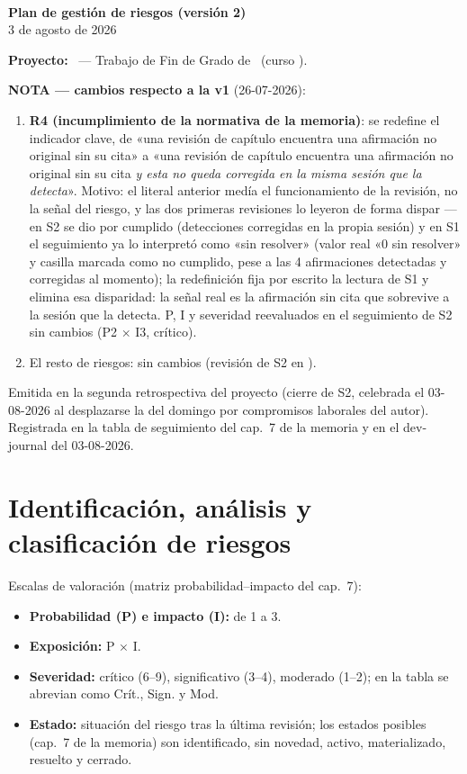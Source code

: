 \documentclass[11pt,a4paper]{article}
\begin{document}
\begin{center}
  {\Huge\bfseries\bukit}\\[0.5cm]
  {\Large\bfseries Plan de gestión de riesgos (versión 2)}\\[0.4cm]
  {\large 3 de agosto de 2026}
\end{center}
\vspace{0.6cm}

\textbf{Proyecto:} \thesisTitle\ — Trabajo de Fin de Grado de \thesisAuthor\ (curso \thesisCourse).

\textbf{NOTA — cambios respecto a la v1} (26-07-2026):
\begin{enumerate}
  \item \textbf{R4 (incumplimiento de la normativa de la memoria)}: se redefine el indicador clave, de «una revisión de capítulo encuentra una afirmación no original sin su cita» a «una revisión de capítulo encuentra una afirmación no original sin su cita \emph{y esta no queda corregida en la misma sesión que la detecta}».
  Motivo: el literal anterior medía el funcionamiento de la revisión, no la señal del riesgo, y las dos primeras revisiones lo leyeron de forma dispar — en S2 se dio por cumplido (detecciones corregidas en la propia sesión) y en S1 el seguimiento ya lo interpretó como «sin resolver» (valor real «0 sin resolver» y casilla marcada como no cumplido, pese a las 4 afirmaciones detectadas y corregidas al momento); la redefinición fija por escrito la lectura de S1 y elimina esa disparidad: la señal real es la afirmación sin cita que sobrevive a la sesión que la detecta.
  P, I y severidad reevaluados en el seguimiento de S2 sin cambios (P2 \(\times\) I3, crítico).
  \item El resto de riesgos: sin cambios (revisión de S2 en ).
\end{enumerate}

Emitida en la segunda retrospectiva del proyecto (cierre de S2, celebrada el 03-08-2026 al desplazarse la del domingo por compromisos laborales del autor).
Registrada en la tabla de seguimiento del cap.~7 de la memoria y en el dev-journal del 03-08-2026.

\section{Identificación, análisis y clasificación de riesgos}

Escalas de valoración (matriz probabilidad--impacto del cap.~7):
\begin{itemize}
  \item \textbf{Probabilidad (P) e impacto (I):} de 1 a 3.
  \item \textbf{Exposición:} P \(\times\) I.
  \item \textbf{Severidad:} crítico (6–9), significativo (3–4), moderado (1–2); en la tabla se abrevian como Crít., Sign. y Mod.
  \item \textbf{Estado:} situación del riesgo tras la última revisión; los estados posibles (cap.~7 de la memoria) son identificado, sin novedad, activo, materializado, resuelto y cerrado.
\end{itemize}
\end{document}
